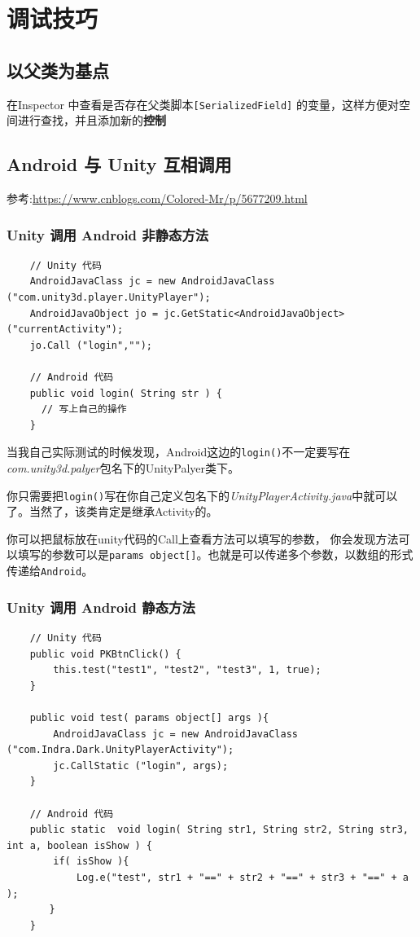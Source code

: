 \documentclass[UTF8,a4paper,12pt]{ctexbook}
\begin{document}
	\section{}
		

\chapter{调试技巧}
	\section{以父类为基点}
		在Inspector 中查看是否存在父类脚本\verb|[SerializedField]| 的变量，这样方便对空间进行查找，并且添加新的\textbf{控制}			
	
	
	\section{Android 与 Unity 互相调用}
		参考:\url{https://www.cnblogs.com/Colored-Mr/p/5677209.html}

		\subsection{Unity 调用 Android 非静态方法}
			\begin{lstlisting}
	// Unity 代码
	AndroidJavaClass jc = new AndroidJavaClass ("com.unity3d.player.UnityPlayer");
	AndroidJavaObject jo = jc.GetStatic<AndroidJavaObject> ("currentActivity");
	jo.Call ("login","");	
	
	// Android 代码
	public void login( String str ) {      
      // 写上自己的操作
	}
			\end{lstlisting}
		
			当我自己实际测试的时候发现，Android这边的\verb|login()|不一定要写在\textit{com.unity3d.palyer}包名下的UnityPalyer类下。
			
			你只需要把\verb|login()|写在你自己定义包名下的\textit{UnityPlayerActivity.java}中就可以了。当然了，该类肯定是继承Activity的。
			
			你可以把鼠标放在unity代码的Call上查看方法可以填写的参数， 你会发现方法可以填写的参数可以是\verb|params object[]|。也就是可以传递多个参数，以数组的形式传递给\verb|Android|。
		
		\subsection{Unity 调用 Android 静态方法}
			\begin{lstlisting}
	// Unity 代码
	public void PKBtnClick() {
	    this.test("test1", "test2", "test3", 1, true);
	}
	
	public void test( params object[] args ){
	    AndroidJavaClass jc = new AndroidJavaClass ("com.Indra.Dark.UnityPlayerActivity");
	    jc.CallStatic ("login", args);
	}
	
	// Android 代码
	public static  void login( String str1, String str2, String str3, int a, boolean isShow ) {
	    if( isShow ){            
	        Log.e("test", str1 + "==" + str2 + "==" + str3 + "==" + a );
	　　}
	}
			\end{lstlisting}
			
\end{document}
